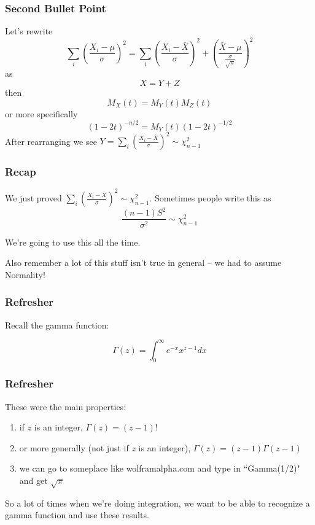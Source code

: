 \documentclass{beamer}
\begin{document}
\begin{frame}
\frametitle{Second Bullet Point}
Let's rewrite 
\[
\sum_i \left( \frac{X_i - \mu}{\sigma} \right) ^2 
= \sum_i \left(\frac{X_i - \bar{X}}{\sigma} \right)^2 + \left( \frac{ \bar{X} - \mu }{ \frac{\sigma}{\sqrt{n}}  } \right)^2
\]
as
\[
X = Y + Z
\]
then
\[
M_X(t) = M_Y(t)M_Z(t)
\]
or more specifically
\[
(1-2t)^{-n/2} = M_Y(t) (1-2t)^{-1/2}
\]
After rearranging we see $Y = \sum_i \left(\frac{X_i - \bar{X}}{\sigma} \right)^2 \sim \chi^2_{n-1}$

\end{frame}


\begin{frame}
\frametitle{Recap}

We just proved $\sum_i \left(\frac{X_i - \bar{X}}{\sigma} \right)^2 \sim \chi^2_{n-1}$. Sometimes people write this as 
\[
\frac{(n-1)S^2}{\sigma^2} \sim \chi^2_{n-1}
\]

We're going to use this all the time. 
\newline

Also remember a lot of this stuff isn't true in general -- we had to assume Normality! 
\end{frame}

% 
% 
% 

\begin{frame}
\frametitle{Refresher}

Recall the gamma function:

\[
\Gamma(z) =  \int_0^{\infty} e^{-x} x^{z - 1} dx
\]

\end{frame}

\begin{frame}
\frametitle{Refresher}

These were the main properties:
\begin{enumerate}
\item if $z$ is an integer, $\Gamma(z) = (z-1)!$
\item or more generally (not just if $z$ is an integer), $\Gamma(z) = (z-1)\Gamma(z-1)$
\item we can go to someplace like wolframalpha.com and type in ``Gamma(1/2)" and get $\sqrt{\pi}$
\end{enumerate}

So a lot of times when we're doing integration, we want to be able to recognize a gamma function and use these results.

\end{frame}
\end{document}
